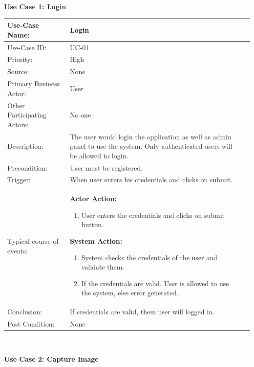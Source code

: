 \noindent
\textbf{Use Case 1: Login}
\begin{table}[H]
    \centering
    \begin{tabular}{|l|p{}|p{}|}
    	\hline
    	Use-Case Name: & Login\\ \hline
    	Use-Case ID:& UC-01 \\\hline
    	Priority:& High\\ \hline
    	Source:& None \\ \hline
    	Primary Business Actor: & User \\ \hline
    	Other Participating Actors:&  No one\\ \hline
    	Description:&  The user would login the application as well as admin panel to use the system. Only authenticated users will be allowed to login. \\ \hline
    	Precondition:&  User must be registered. \\ \hline
    	Trigger:&  When user enters his credentials and clicks on submit. \\ \hline 
    	Typical course of events:&  \textbf{Actor Action:}
    	\begin{enumerate}
    		\item 	User enters the credentials and clicks on submit button.
    	\end{enumerate}
    
    	\vspace{2mm}
    	
    	\textbf{System Action: }
    	\begin{enumerate}
    		\item System checks the credentials of the user and validate them.
    		\item 	If the credentials are valid. User is allowed to use the system, else error generated. 
    	\end{enumerate}
    	\\ \hline
    	Conclusion:  & If credentials are valid, them user will logged in.\\ \hline
    	Post Condition: & None \\ \hline
    \end{tabular}\\
\end{table}

\pagebreak

\noindent
\textbf{Use Case 2: Capture Image}

